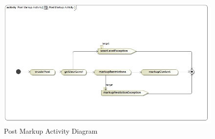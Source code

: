 \documentclass[11pt]{article}
\begin{document}
\begin{enumerate}
\graphicspath{ {../Diagrams/Matt/Activity/} }
	  \begin{figure}[H]	
    	\includegraphics[scale=0.5,center]{PostMarkupActivity.jpg}
    	\caption{Post Markup Activity Diagram}
	\end{figure}
	

\end{enumerate}
\end{document}
